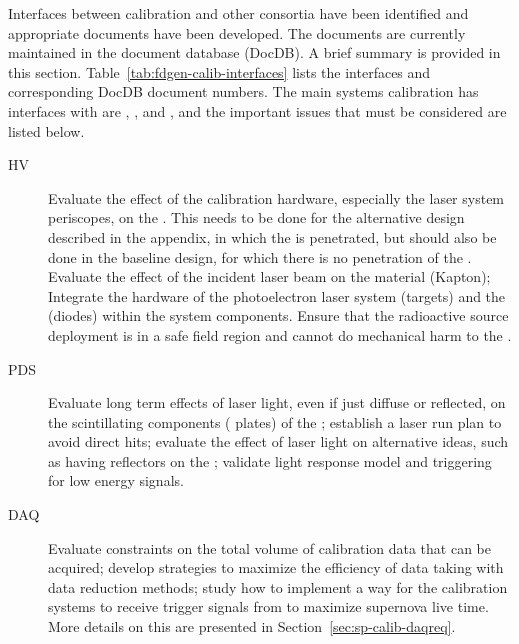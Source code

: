 
Interfaces between calibration and other consortia have been identified and appropriate documents have been developed. %
The documents are currently maintained in the  document database (DocDB). %
A brief summary is provided in this section. Table~\ref{tab:fdgen-calib-interfaces} lists the interfaces and corresponding DocDB document numbers. 
The main systems calibration has interfaces with are , , and , and the important issues that must be considered are listed below.

\begin{description}
    \item[HV] Evaluate the effect of the calibration hardware, especially the laser system periscopes, on the \efield. This needs to be done for the alternative design described in the appendix, in which the  is penetrated, but should also be done in the baseline design, for which there is no penetration of the . 
    Evaluate the effect of the incident laser beam on the  material (Kapton); Integrate the hardware of the %
    photoelectron laser system (targets) and the  (diodes) within the  system components. Ensure that the radioactive source deployment is in a safe field region and cannot do mechanical harm to the .
    \item[PDS] Evaluate long term effects of laser light, even if just diffuse or reflected, on the scintillating components ( plates) of the ; establish a laser run plan to avoid direct hits; evaluate the effect of laser light on alternative  ideas, such as having reflectors on the ; validate light response model and triggering for low energy signals. 
    \item[DAQ] Evaluate  constraints on the total volume of calibration data that can be acquired; develop strategies to maximize the efficiency of data taking with data reduction methods; study how to implement a way for the calibration systems to receive trigger signals from  to maximize supernova live time. More details on this are presented in Section~\ref{sec:sp-calib-daqreq}.
\end{description}


